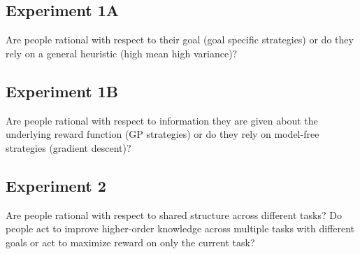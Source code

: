 \documentclass[10pt,letterpaper]{article}
\begin{document}
	\subsection{Experiment 1A}
	
	Are people rational with respect to their goal (goal specific strategies) or do they rely on a general heuristic (high mean high variance)?
	
	\subsection{Experiment 1B}
	
	Are people rational with respect to information they are given about the underlying reward function (GP strategies) or do they rely on model-free strategies (gradient descent)?
	
	\subsection{Experiment 2}
	
	Are people rational with respect to shared structure across different tasks? Do people act to improve higher-order knowledge across multiple tasks with different goals or act to maximize reward on only the current task?
	
	
	
	\setlength{\bibleftmargin}{.125in}
	\setlength{\bibindent}{-\bibleftmargin}
	
	
		
	
\end{document}
